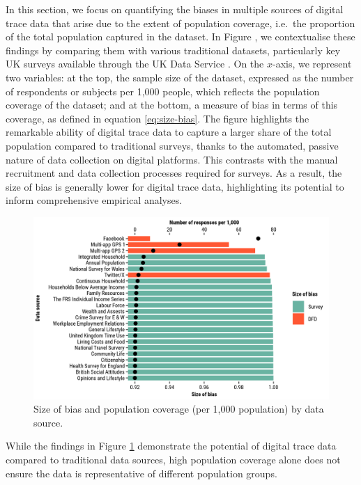 \documentclass[]{rsos}%
\begin{document}
In this section, we focus on quantifying the biases in multiple sources
of digital trace data that arise due to the extent of population
coverage, i.e.~the proportion of the total population captured in the
dataset. In Figure , we contextualise these findings by comparing them
with various traditional datasets, particularly key UK surveys available
through the UK Data Service \citep{ukdataserviceSurveysData}. On the
\(x\)-axis, we represent two variables: at the top, the sample size of the
dataset, expressed as the number of respondents or subjects per 1,000
people, which reflects the population coverage of the dataset; and at
the bottom, a measure of bias in terms of this coverage, as defined in
equation \ref{eq:size-bias}. The figure highlights the remarkable
ability of digital trace data to capture a larger share of the total
population compared to traditional surveys, thanks to the automated,
passive nature of data collection on digital platforms. This contrasts
with the manual recruitment and data collection processes required for
surveys. As a result, the size of bias is generally lower for digital
trace data, highlighting its potential to inform comprehensive empirical
analyses.

\begin{figure}
\centering
\includegraphics{figures/compare-surveys-two-axis.png}
\caption{Size of bias and population coverage (per 1,000 population) by data
source.}\label{fig:survey}
\end{figure}

While the findings in Figure \ref{fig:survey} demonstrate the potential
of digital trace data compared to traditional data sources, high
population coverage alone does not ensure the data is representative of
different population groups.
\end{document}
